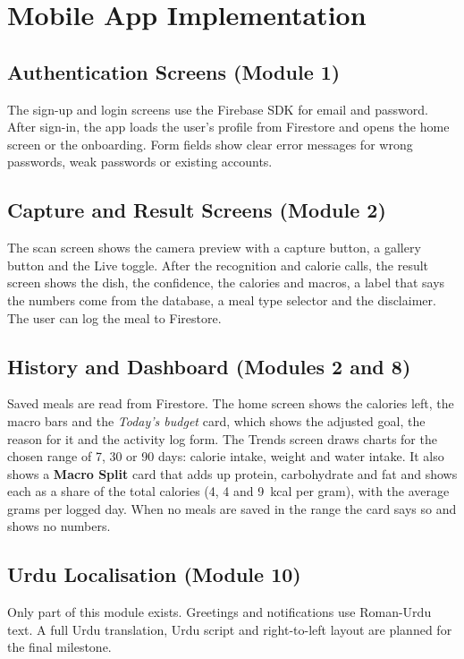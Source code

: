 \section{Mobile App Implementation}
\subsection{Authentication Screens (Module 1)}
The sign-up and login screens use the Firebase SDK for email and password. After sign-in, the app loads the
user's profile from Firestore and opens the home screen or the onboarding. Form fields show clear error messages
for wrong passwords, weak passwords or existing accounts.

\subsection{Capture and Result Screens (Module 2)}
The scan screen shows the camera preview with a capture button, a gallery button and the Live toggle. After the
recognition and calorie calls, the result screen shows the dish, the confidence, the calories and macros, a label
that says the numbers come from the database, a meal type selector and the disclaimer. The user can log the meal
to Firestore.

\subsection{History and Dashboard (Modules 2 and 8)}
Saved meals are read from Firestore. The home screen shows the calories left, the macro bars and the
\emph{Today's budget} card, which shows the adjusted goal, the reason for it and the activity log form. The Trends
screen draws charts for the chosen range of 7, 30 or 90 days: calorie intake, weight and water intake. It also shows
a \textbf{Macro Split} card that adds up protein, carbohydrate and fat and shows each as a share of the total
calories (4, 4 and 9~kcal per gram), with the average grams per logged day. When no meals are saved in the range
the card says so and shows no numbers.

\subsection{Urdu Localisation (Module 10)}
Only part of this module exists. Greetings and notifications use Roman-Urdu text. A full Urdu translation, Urdu
script and right-to-left layout are planned for the final milestone.

